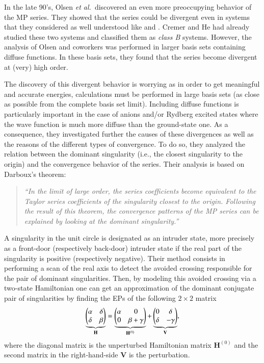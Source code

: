 \documentclass[aps,prb,reprint,noshowkeys,superscriptaddress]{revtex4-1}
\newcommand{\latin}[1]{#1}
\newcommand{\ie}{\latin{i.e.}}
\newcommand{\bH}{\mathbf{H}}
\newcommand{\bV}{\mathbf{V}}
\begin{document}
In the late 90's, Olsen \textit{et al.}~discovered an even more preoccupying behavior of the MP series. \cite{Olsen_1996} They showed that the series could be divergent even in systems that they considered as well understood like  and . \cite{Olsen_1996, Christiansen_1996} Cremer and He had already studied these two systems and classified them as \textit{class B} systems. However, the analysis of Olsen and coworkers was performed in larger basis sets containing diffuse functions. In these basis sets, they found that the series become divergent at (very) high order.

The discovery of this divergent behavior is worrying as in order to get meaningful and accurate energies, calculations must be performed in large basis sets (as close as possible from the complete basis set limit). Including diffuse functions is particularly important in the case of anions and/or Rydberg excited states where the wave function is much more diffuse than the ground-state one. As a consequence, they investigated further the causes of these divergences as well as the reasons of the different types of convergence. To do so, they analyzed the relation between the dominant singularity (\ie, the closest singularity to the origin) and the convergence behavior of the series. \cite{Olsen_2000} Their analysis is based on Darboux's theorem: 
\begin{quote}
	\textit{``In the limit of large order, the series coefficients become equivalent to the Taylor series coefficients of the singularity closest to the origin. Following the result of this theorem, the convergence patterns of the MP series can be explained by looking at the dominant singularity.''}
\end{quote}

A singularity in the unit circle is designated as an intruder state, more precisely as a front-door (respectively back-door) intruder state if the real part of the singularity is positive (respectively negative). Their method consists in performing a scan of the real axis to detect the avoided crossing responsible for the pair of dominant singularities. Then, by modeling this avoided crossing via a two-state Hamiltonian one can get an approximation of the dominant conjugate pair of singularities by finding the EPs of the following $2\times2$ matrix
\begin{equation}
	\underbrace{\mqty(\alpha & \delta \\ \delta & \beta)}_{\bH} = \underbrace{\mqty(\alpha & 0 \\ 0 & \beta + \gamma )}_{\bH^{(0)}} + \underbrace{\mqty( 0 & \delta \\ \delta & - \gamma)}_{\bV},
\end{equation}
where the diagonal matrix is the unperturbed Hamiltonian matrix $\bH^{(0)}$ and the second matrix in the right-hand-side $\bV$ is the perturbation.
\end{document}
